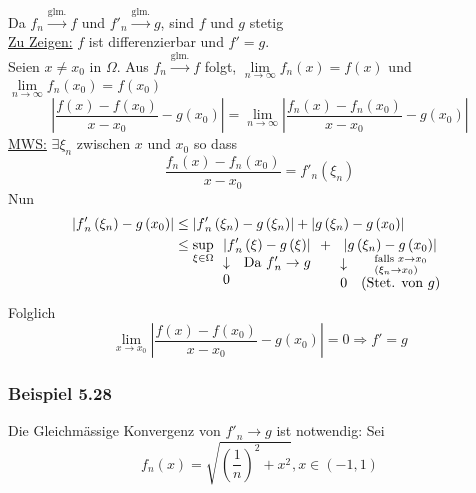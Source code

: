 \begin{beweis}{}
Da ${f_n}\mathop  \to \limits^{\text{glm.}} f$ und ${f'_n}\mathop  \to \limits^{\text{glm.}} g$, sind $f$ und $g$ stetig\\
\underline{Zu Zeigen:} $f$ ist differenzierbar und $f'=g$.\\

Seien $x\not=x_0$ in $\Omega$. Aus ${f_n}\mathop  \to \limits^{\text{glm.}} f$ folgt, $\mathop {\lim }\limits_{n \to \infty } {f_n}\left( x \right) = f\left( x \right)$ und $\mathop {\lim }\limits_{n \to \infty } {f_n}\left( {{x_0}} \right) = f\left( {{x_0}} \right)$
\[\left| {\frac{{f\left( x \right) - f\left( {{x_0}} \right)}}{{x - {x_0}}} - g\left( {{x_0}} \right)} \right| = \mathop {\lim }\limits_{n \to \infty } \left| {\frac{{{f_n}\left( x \right) - {f_n}\left( {{x_0}} \right)}}{{x - {x_0}}} - g\left( {{x_0}} \right)} \right|\]
\underline{MWS:} $\exists\xi_n$ zwischen $x$ und $x_0$ so dass 
\[\frac{{{f_n}\left( x \right) - {f_n}\left( {{x_0}} \right)}}{{x - {x_0}}} = f{'_n}\left( {{\xi _n}} \right)\]
Nun
\begin{align*}
\left| {f{'_n}\left( {{\xi _n}} \right) - g\left( {{x_0}} \right)} \right| &\le \left| {f{'_n}\left( {{\xi _n}} \right) - g\left( {{\xi _n}} \right)} \right| + \left| {g\left( {{\xi _n}} \right) - g\left( {{x_0}} \right)} \right|\\
 &\le \mathop {\sup }\limits_{\xi  \in \Omega } \mathop {\left| {f{'_n}\left( \xi  \right) - g\left( \xi  \right)} \right|}\limits_{\begin{array}{*{20}{c}}
 \downarrow &{{\text{Da }}f{'_n} \to g}\\
0&{}
\end{array}}  + \mathop {\left| {g\left( {{\xi _n}} \right) - g\left( {{x_0}} \right)} \right|}\limits_{\begin{array}{*{20}{c}}
 \downarrow &{\scriptstyle{\text{falls }}x \to {x_0}\hfill\atop
\scriptstyle\left( {{\xi _n} \to {x_0}} \right)\hfill}\\
0&{({\text{Stet. von }}g)}
\end{array}} 
\end{align*}
Folglich 
\[\mathop {\lim }\limits_{x \to {x_0}} \left| {\frac{{f\left( x \right) - f\left( {{x_0}} \right)}}{{x - {x_0}}} - g\left( {{x_0}} \right)} \right| = 0 \Rightarrow f' = g\]
\end{beweis}

\subsubsection*{Beispiel 5.28}
Die Gleichmässige Konvergenz von $f'_n\to g$ ist notwendig: Sei 
\[{f_n}\left( x \right) = \sqrt {{{\left( {\frac{1}{n}} \right)}^2} + {x^2}} ,x \in \left( { - 1,1} \right)\]
